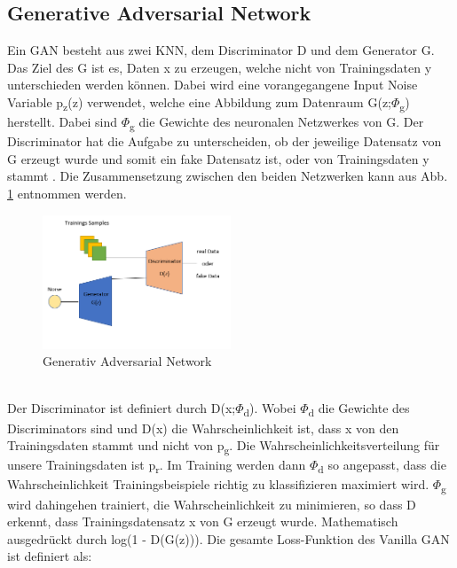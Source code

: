 \documentclass{llncs}
\begin{document}
\subsection{Generative Adversarial Network}

Ein GAN besteht aus zwei KNN, dem Discriminator D und dem Generator G. Das Ziel des G ist es, Daten x zu erzeugen, welche nicht von Trainingsdaten y unterschieden werden können. Dabei wird eine vorangegangene Input Noise Variable p\textsubscript{z}(z) verwendet, welche eine Abbildung zum Datenraum G(z;$\Phi$\textsubscript{g}) herstellt. Dabei sind $\Phi$\textsubscript{g} die Gewichte des neuronalen Netzwerkes von G. Der Discriminator hat die Aufgabe zu unterscheiden, ob der jeweilige Datensatz von G erzeugt wurde und somit ein fake Datensatz ist, oder von Trainingsdaten y stammt \cite{goodfellow2014}. Die Zusammensetzung zwischen den beiden Netzwerken kann aus Abb. \ref{fig:Bild20} entnommen werden.
\\
\begin{figure}[htbp] 
	\centering
	\includegraphics[width=0.5\textwidth]{GAN_GRUNDAUFBAU.png}
	\caption{Generativ Adversarial Network \protect\cite{ganpic}}
	\label{fig:Bild20}
\end{figure}
\\
Der Discriminator ist definiert durch D(x;$\Phi$\textsubscript{d}). Wobei $\Phi$\textsubscript{d} die Gewichte des Discriminators sind und D(x) die Wahrscheinlichkeit ist, dass x von den Trainingsdaten stammt und nicht von p\textsubscript{g}. Die Wahrscheinlichkeitsverteilung für unsere Trainingsdaten ist p\textsubscript{r}.  Im Training werden dann $\Phi$\textsubscript{d} so angepasst, dass die Wahrscheinlichkeit Trainingsbeispiele richtig zu klassifizieren maximiert wird. $\Phi$\textsubscript{g} wird dahingehen trainiert, die Wahrscheinlichkeit zu minimieren, so dass D erkennt, dass Trainingsdatensatz x von G erzeugt wurde. Mathematisch ausgedrückt durch log(1 - D(G(z))). Die gesamte Loss-Funktion des Vanilla GAN ist definiert als:
\\\\
\end{document}
